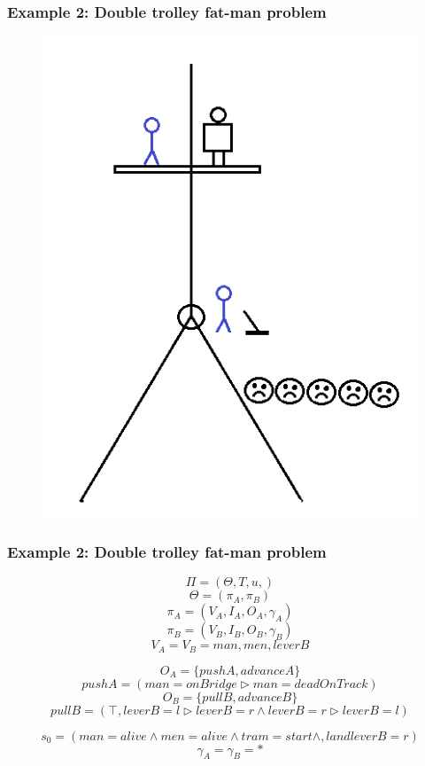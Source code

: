 \documentclass{beamer}
\begin{document}
\begin{frame}
\frametitle{Example 2: Double trolley fat-man problem}


\begin{figure}
\includegraphics[scale=1]{extended2}
\end{figure}
\end{frame}

\begin{frame}
\frametitle{Example 2: Double trolley fat-man problem}
\[
\Pi = \left( \Theta, T, u, \right)
\]
\[
\Theta=(\pi_A, \pi_B)
\]
\[
\pi_A = (V_A, I_A, O_A, \gamma_A)
\]
\[
\pi_B = (V_B, I_B, O_B, \gamma_B)
\]
\[
V_A = V_B = {man, men, leverB}
\]

\[
O_A = \{pushA, advanceA\}
\]
\[
pushA = (man=onBridge \triangleright man = deadOnTrack)
\]
\[
O_B = \{pullB, advanceB\}
\]
\[
pullB = (\top, leverB=l \triangleright leverB=r \land leverB=r \triangleright leverB=l)
\]

\[
s_0 = (man=alive \land men=alive \land tram = start \land, land leverB = r)
\]
\[
\gamma_A=\gamma_B = *
\]
\end{frame}


\end{document}
